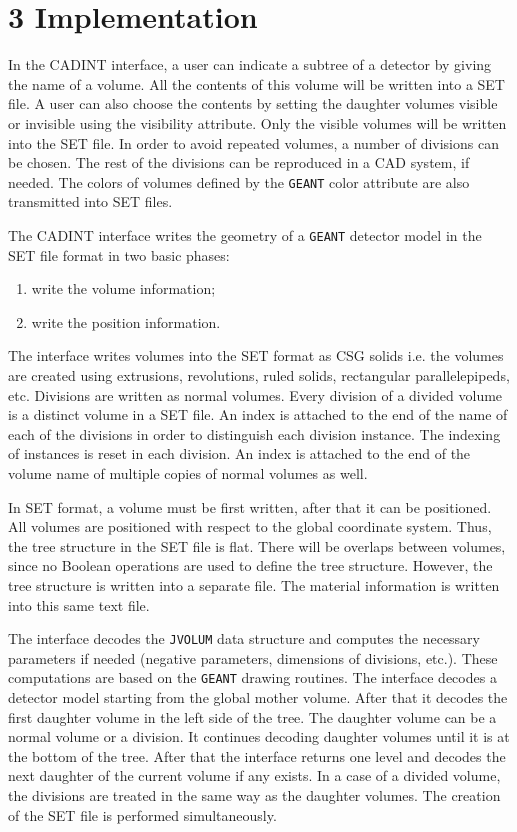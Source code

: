 \section*{3 Implementation}
 
 
In the CADINT interface,
a user can indicate a subtree of a detector by giving the name of a volume.
All the contents of this volume will be written into a SET file.
A user can also choose the contents by setting the daughter volumes
visible or invisible using the visibility attribute. Only the visible
volumes will be written into the SET file.
In order to avoid repeated volumes, a number of divisions can be chosen.
The rest of the divisions can be reproduced in a CAD system, if needed.
The colors of volumes defined by the {\tt GEANT} color attribute are
also transmitted into SET files.
 
 
The CADINT interface writes the geometry of a {\tt GEANT} detector model
in the SET file format in two basic phases:\\[-0.7cm]
 
\begin{enumerate}
\item write the volume information;\\[-0.7cm]
\item write the position information.\\[-0.5cm]
\end{enumerate}
 
The interface writes volumes into the SET format as
CSG solids i.e. the volumes are created using extrusions, revolutions,
ruled solids, rectangular parallelepipeds, etc.
Divisions are written as normal volumes.
Every division of a divided volume is
a distinct volume in a SET file. An index is attached to the end
of the name of each of
the divisions in order to distinguish each division instance.
The indexing of instances is reset in each division.
An index is attached to the end of the volume name of multiple copies
of normal volumes as well.
 
In SET format, a volume must be first written, after that it can
be positioned. All volumes are positioned with respect to
the global coordinate system. Thus, the tree structure
in the SET file is flat. There will be overlaps between volumes,
since no Boolean operations
are used to define the tree structure. However, the tree structure
is written into a separate file. The material information
is written into this same text file.
 
The interface  decodes the {\tt JVOLUM} data structure and
computes the necessary parameters if needed (negative parameters,
dimensions of divisions, etc.).
These computations are based on the {\tt GEANT} drawing routines.
The interface decodes a detector model starting from the global
mother volume. After that it decodes the first daughter volume in the
left side of the tree. The daughter volume can be a normal volume or a division.
It continues decoding daughter volumes until it
is at the bottom of the tree. After that the interface
returns one level and decodes the next daughter of the current volume
if any exists. In a case of a divided volume, the divisions are treated
in the same way as the daughter volumes.
The creation of the SET file is performed simultaneously.
 
